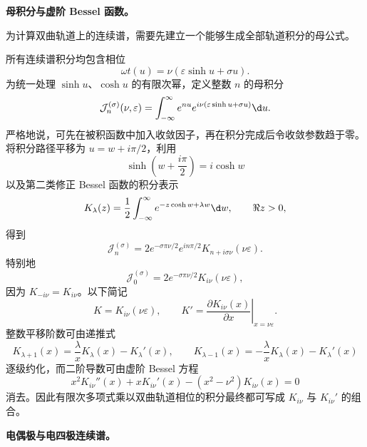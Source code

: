 \textbf{母积分与虚阶 Bessel 函数。}

为计算双曲轨道上的连续谱，需要先建立一个能够生成全部轨道积分的母公式。

所有连续谱积分均包含相位
\begin{equation*}
	\omega t(u)=\nu\left(\varepsilon\sinh u+\sigma u\right).
\end{equation*}
为统一处理 $\sinh u$、$\cosh u$ 的有限次幂，定义整数 $n$ 的母积分
\begin{equation*}
	\mathcal J_n^{(\sigma)}(\nu,\varepsilon)
	=\int_{-\infty}^{\infty}
	e^{nu}e^{i\nu(\varepsilon\sinh u+\sigma u)}\d u.
\end{equation*}
严格地说，可先在被积函数中加入收敛因子，再在积分完成后令收敛参数趋于零。将积分路径平移为 $u=w+i\pi/2$，利用
\begin{equation*}
	\sinh\left(w+\frac{i\pi}{2}\right)=i\cosh w
\end{equation*}
以及第二类修正 Bessel 函数的积分表示
\begin{equation*}
	K_\lambda(z)=\frac{1}{2}\int_{-\infty}^{\infty}
	e^{-z\cosh w+\lambda w}\d w,
	\qquad \Re z>0,
\end{equation*}
得到
\begin{equation*}
	\mathcal J_n^{(\sigma)}
	=2e^{-\sigma\pi\nu/2}e^{in\pi/2}
	K_{n+i\sigma\nu}(\nu\varepsilon).
\end{equation*}
特别地
\begin{equation*}
	\mathcal J_0^{(\sigma)}
	=2e^{-\sigma\pi\nu/2}K_{i\nu}(\nu\varepsilon),
\end{equation*}
因为 $K_{-i\nu}=K_{i\nu}$。以下简记
\begin{equation*}
	K=K_{i\nu}(\nu\varepsilon),
	\qquad
	K'=\left.\frac{\partial K_{i\nu}(x)}{\partial x}\right|_{x=\nu\varepsilon}.
\end{equation*}
整数平移阶数可由递推式
\begin{equation*}
	K_{\lambda+1}(x)=\frac{\lambda}{x}K_\lambda(x)-K_\lambda'(x),
	\qquad
	K_{\lambda-1}(x)=-\frac{\lambda}{x}K_\lambda(x)-K_\lambda'(x)
\end{equation*}
逐级约化，而二阶导数可由虚阶 Bessel 方程
\begin{equation*}
	x^2K_{i\nu}''(x)+xK_{i\nu}'(x)-(x^2-\nu^2)K_{i\nu}(x)=0
\end{equation*}
消去。因此有限次多项式乘以双曲轨道相位的积分最终都可写成 $K_{i\nu}$ 与 $K_{i\nu}'$ 的组合。

\textbf{电偶极与电四极连续谱。}

